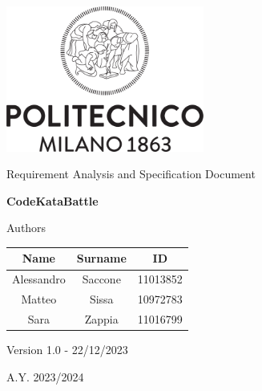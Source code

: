 \documentclass[12pt,a4paper]{article}
\begin{document}
\begin{titlepage}
    \centering
    \includegraphics[width=6.5cm]{Logo_Politecnico_Milano.png} \par
    \vspace*{2.3cm}
    {\LARGE Requirement Analysis and Specification Document}\par
   
   
    \vspace*{0.8cm}
    {\Large \textbf{CodeKataBattle}}\par
    \vspace*{6.8cm}
    
    \setlength{\tabcolsep}{1.1cm}
    \large Authors \par
    \begin{table}[h]
      \centering
      
      \renewcommand{\arraystretch}{2} 
      \begin{tabular}{c c c }
        \textbf{Name} & \textbf{Surname} & \textbf{ID} \\
        \hline
        Alessandro & Saccone & 11013852 \\
        
        Matteo & Sissa & 10972783  \\
        
        Sara & Zappia & 11016799\\
        
      \end{tabular}
    \end{table}
    \vspace*{1.3cm}
    \small{ Version 1.0 - 22/12/2023}\par
    \vspace*{0.3cm}
    \small{ A.Y. 2023/2024}\par
\end{titlepage}

\clearpage
\tableofcontents
\clearpage


\clearpage

\clearpage

\clearpage

\clearpage
\end{document}

